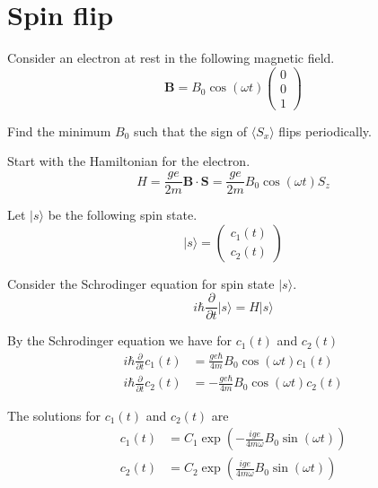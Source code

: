 

\section*{Spin flip}

Consider an electron at rest in the following magnetic field.
\begin{equation*}
\mathbf B=B_0\cos(\omega t)\begin{pmatrix}0\\0\\1\end{pmatrix}
\end{equation*}

Find the minimum $B_0$ such that the sign of $\langle S_x\rangle$
flips periodically.

\bigskip
Start with the Hamiltonian for the electron.
\begin{equation*}
H=\frac{ge}{2m}\mathbf B\cdot\mathbf S
=\frac{ge}{2m}B_0\cos(\omega t)S_z
\end{equation*}

Let $|s\rangle$ be the following spin state.
\begin{equation*}
|s\rangle=\begin{pmatrix}c_1(t)\\c_2(t)\end{pmatrix}
\end{equation*}

Consider the Schrodinger equation for spin state $|s\rangle$.
\begin{equation*}
i\hbar\frac{\partial}{\partial t}|s\rangle=H|s\rangle
\end{equation*}

By the Schrodinger equation we have for $c_1(t)$ and $c_2(t)$
\begin{align*}
i\hbar\frac{\partial}{\partial t}c_1(t)&=\frac{ge\hbar}{4m}B_0\cos(\omega t)c_1(t)
\\
i\hbar\frac{\partial}{\partial t}c_2(t)&=-\frac{ge\hbar}{4m}B_0\cos(\omega t)c_2(t)
\end{align*}

The solutions for $c_1(t)$ and $c_2(t)$ are
\begin{equation*}
\begin{aligned}
c_1(t)&=C_1\exp\left(-\frac{ige}{4m\omega}B_0\sin(\omega t)\right)
\\
c_2(t)&=C_2\exp\left(\frac{ige}{4m\omega}B_0\sin(\omega t)\right)
\end{aligned}
\tag{1}
\end{equation*}

